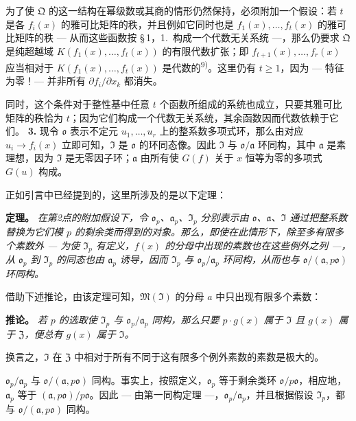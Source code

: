 \documentclass[11pt]{article}
\begin{document}
为了使 $\mathfrak{Q}$ 的这一结构在幂级数或其商的情形仍然保持，必须附加一个假设：若 $t$ 是各 $f_i(x)$ 的雅可比矩阵的秩，并且例如它同时也是 $f_1(x),\ldots,f_t(x)$ 的雅可比矩阵的秩 --- 从而这些函数按 \S\,1，1.\ 构成一个代数无关系统 ---，那么仍要求 $\mathfrak{Q}$ 是纯超越域 $K(f_1(x),\ldots,f_t(x))$ 的有限代数扩张；即 $f_{t+1}(x),\ldots,f_r(x)$ 应当相对于 $K(f_1(x),\ldots,f_t(x))$ 是代数的\textsuperscript{9)}。这里仍有 $t \geq 1$，因为 --- 特征为零！--- 并非所有 $\partial f_i/\partial x_k$ 都消失。

同时，这个条件对于整性基中任意 $t$ 个函数所组成的系统也成立，只要其雅可比矩阵的秩恰为 $t$；因为它们构成一个代数无关系统，其余函数因而代数依赖于它们。
\medskip\noindent\textbf{3.}
现令 $\mathfrak{o}$ 表示不定元 $u_1,\ldots,u_r$ 上的整系数多项式环，那么由对应 $u_i \to f_i(x)$ 立即可知，$\mathfrak{I}$ 是 $\mathfrak{o}$ 的环同态像。因此 $\mathfrak{I}$ 与 $\mathfrak{o}/\mathfrak{a}$ 环同构，其中 $\mathfrak{a}$ 是素理想，因为 $\mathfrak{I}$ 是无零因子环；$\mathfrak{a}$ 由所有使 $G(f)$ 关于 $x$ 恒等为零的多项式 $G(u)$ 构成。

正如引言中已经提到的，这里所涉及的是以下定理：

\medskip\noindent\textbf{定理。}
\textit{在第2点的附加假设下，令 $\mathfrak{o}_p$、$\mathfrak{a}_p$、$\mathfrak{I}_p$ 分别表示由 $\mathfrak{o}$、$\mathfrak{a}$、$\mathfrak{I}$ 通过把整系数替换为它们模 $p$ 的剩余类而得到的对象。那么，即使在此情形下，除至多有限多个素数外 --- 为使 $\mathfrak{I}_p$ 有定义，$f(x)$ 的分母中出现的素数也在这些例外之列 ---，从 $\mathfrak{o}_p$ 到 $\mathfrak{I}_p$ 的同态也由 $\mathfrak{a}_p$ 诱导，因而 $\mathfrak{I}_p$ 与 $\mathfrak{o}_p/\mathfrak{a}_p$ 环同构，从而也与 $\mathfrak{o}/(\mathfrak{a}, p\mathfrak{o})$ 环同构。}

借助下述推论，由该定理可知，$\mathfrak{M}(\mathfrak{I})$ 的分母 $a$ 中只出现有限多个素数：

\medskip\noindent\textbf{推论。}
\textit{若 $p$ 的选取使 $\mathfrak{I}_p$ 与 $\mathfrak{o}_p/\mathfrak{a}_p$ 同构，那么只要 $p \cdot g(x)$ 属于 $\mathfrak{I}$ 且 $g(x)$ 属于 $\mathfrak{Z}$，便总有 $g(x)$ 属于 $\mathfrak{I}$。}

换言之，$\mathfrak{I}$ 在 $\mathfrak{Z}$ 中相对于所有不同于这有限多个例外素数的素数是极大的。

$\mathfrak{o}_p/\mathfrak{a}_p$ 与 $\mathfrak{o}/(\mathfrak{a}, p\mathfrak{o})$ 同构。事实上，按照定义，$\mathfrak{o}_p$ 等于剩余类环 $\mathfrak{o}/p\mathfrak{o}$，相应地，$\mathfrak{a}_p$ 等于 $(\mathfrak{a}, p\mathfrak{o})/p\mathfrak{o}$。因此 --- 由第一同构定理 ---，$\mathfrak{o}_p/\mathfrak{a}_p$，并且根据假设 $\mathfrak{I}_p$，都与 $\mathfrak{o}/(\mathfrak{a}, p\mathfrak{o})$ 同构。
\end{document}
